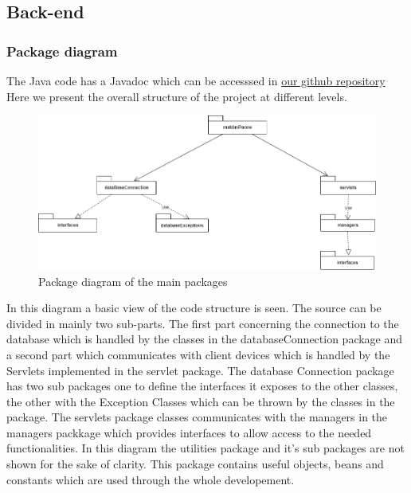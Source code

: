 \subsection{Back-end}
\subsubsection{Package diagram}
The Java code has a Javadoc which can be accesssed in \href{https://github.com/pm390/MaldiniPaone/tree/master/Implementation\&Testing/SafeStreets/doc}{our github repository} 
Here we present the overall structure of the project at different levels.
\begin{figure}[h]
\centering
\includegraphics[width=\textwidth]{Images/packageDiagram.png}
\caption{\label{fig:pK} Package diagram of the main packages}
\end{figure}
In this diagram a basic view of the code structure is seen. The source can be divided in mainly two sub-parts. The first part concerning the connection to the database which is handled by the classes in the databaseConnection package and a second part
which communicates with client devices which is handled by the Servlets implemented in the servlet package.
The database Connection package has two sub packages one to define the interfaces it exposes to the other classes, the other with the Exception Classes which can be thrown by the classes in the package.
The servlets package classes communicates with the managers in the managers packkage which provides interfaces to allow access to the needed functionalities.
In this diagram the utilities package and it's sub packages are not shown for the sake of clarity. 
This package contains useful objects, beans and constants which are used through the whole developement.
\clearpage
